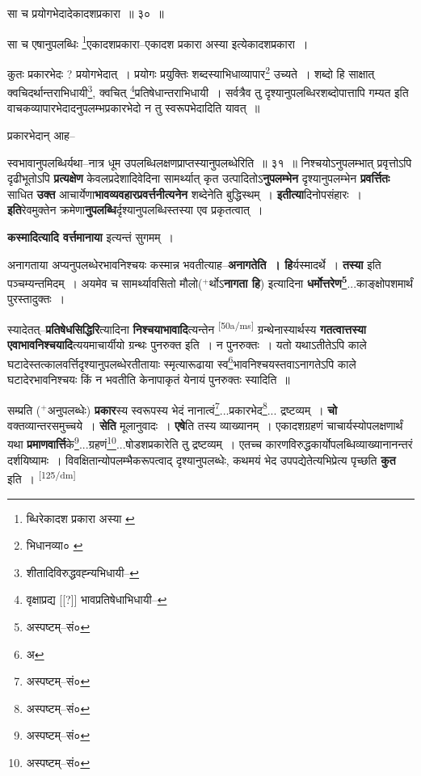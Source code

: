 \documentclass[article,12pt,a4paper]{memoir}
\newcommand{\add}[1]{($^{+}$#1)}
\begin{document}
	सा च प्रयोगभेदादेकादशप्रकारा ॥ ३० ॥ 
	  
	सा च एषानुपलब्धिः \footnote{ब्धिरेकादश प्रकारा अस्या \cite{dp-msA} \cite{dp-edP} \cite{dp-edE}}एकादशप्रकारा--एकादश प्रकारा अस्या इत्येकादशप्रकारा । 
	  
	कुतः प्रकारभेदः ? प्रयोगभेदात् । प्रयोगः प्रयुक्तिः शब्दस्याभिधाव्यापार\footnote{भिधानव्या० \cite{dp-msA} \cite{dp-msB} \cite{dp-msC} \cite{dp-msD} \cite{dp-edP} \cite{dp-edH} \cite{dp-edE} \cite{dp-edN}} उच्यते । शब्दो हि साक्षात् क्वचिदर्थान्तराभिधायी\footnote{शीतादिविरुद्धवह्न्यभिधायी--\cite{dp-msD-n}}, क्वचित् \footnote{वृक्षाप्रद्य [[?]] भावप्रतिषेधाभिधायी--\cite{dp-msD-n}}प्रतिषेधान्तराभिधायी । सर्वत्रैव तु दृश्यानुपलब्धिरशब्दोपात्तापि गम्यत इति वाचकव्यापारभेदादनुपलम्भप्रकारभेदो न तु स्वरूपभेदादिति यावत् ॥ 
	  
	प्रकारभेदान् आह-- 
	  
	स्वभावानुपलब्धिर्यथा--नात्र धूम उपलब्धिलक्षणप्राप्तस्यानुपलब्धेरिति ॥ ३१ ॥ निश्चयोऽनुपलम्भात् प्रवृत्तोऽपि दृढीभूतोऽपि \textbf{प्रत्यक्षेण} केवलप्रदेशादिवेदिना सामर्थ्यात् कृत उत्पादितोऽ\textbf{नुपलम्भेन} दृश्यानुपलम्भेन \textbf{प्रवर्त्तितः} साधित \textbf{उक्त} आचार्येणा\textbf{भावव्यवहारप्रवर्त्तनीत्यनेन} शब्देनेति बुद्धिस्थम् । \textbf{इतीत्या}दिनोपसंहारः । \textbf{इति}रेवमुक्तेन क्रमेणा\textbf{नुपलब्धि}र्दृश्यानुपलब्धिस्तस्या एव प्रकृतत्वात् ।
	\pend
      

	  \pstart \textbf{कस्मादित्यादि वर्त्तमानाया} इत्यन्तं सुगमम् ।
	\pend
      

	  \pstart अनागताया अप्यनुपलब्धेरभावनिश्चयः कस्मान्न भवतीत्याह--\textbf{अनागतेति । हि}र्यस्मादर्थे । \textbf{तस्या} इति पञ्चम्यन्तमिदम् । अयमेव च सामर्थ्यावसितो मौलो\add{र्थोऽ\textbf{नागता हि}} इत्यादिना \textbf{धर्मोत्तरेण\footnote{अस्पष्टम्--सं०}}...काङ्क्षोपशमार्थं पुरस्तादुक्तः ।
	\pend
      

	  \pstart स्यादेतत्--\textbf{प्रतिषेधसिद्धिरि}त्यादिना \textbf{निश्चयाभावादि}त्यन्तेन \leavevmode\textsuperscript{\rmlatinfont\tiny [50a/ms]} ग्रन्थेनास्यार्थस्य \textbf{गतत्वात्तस्या एवाभावनिश्चयादि}त्ययमाचार्यीयो ग्रन्थः पुनरुक्त इति । न पुनरुक्तः । यतो यथाऽतीतेऽपि काले घटादेस्तत्कालवर्त्तिदृश्यानुपलब्धेरतीतायाः स्मृत्यारूढाया स्व\footnote{अ}भावनिश्चयस्तवाऽनागतेऽपि काले घटादेरभावनिश्चयः किं न भवतीति केनापाकृतं येनायं पुनरुक्तः स्यादिति ॥
	\pend
      

	  \pstart सम्प्रति \add{अनुपलब्धेः} \textbf{प्रकार}स्य स्वरूपस्य भेदं नानात्वं\footnote{अस्पष्टम्--सं०}...प्रकारभेद\footnote{अस्पष्टम्--सं०}... द्रष्टव्यम् । \textbf{चो} वक्तव्यान्तरसमुच्चये । \textbf{सेति} मूलानुवादः । \textbf{एषे}ति तस्य व्याख्यानम् । एकादशग्रहणं चाचार्यस्योपलक्षणार्थं यथा \textbf{प्रमाणवार्त्ति}के\footnote{अस्पष्टम्--सं०}...ग्रहणं\footnote{अस्पष्टम्--सं०}...षोडशप्रकारेति तु द्रष्टव्यम् । एतच्च कारणविरुद्धकार्योपलब्धिव्याख्यानानन्तरं दर्शयिष्यामः । विवक्षितान्योपलम्भैकरूपत्वाद् दृश्यानुपलब्धेः, कथमयं भेद उपपद्येतेत्यभिप्रेत्य पृच्छति \textbf{कुत} इति ।  \leavevmode\textsuperscript{\rmlatinfont\tiny [125/dm]} 
	  
\end{document}
